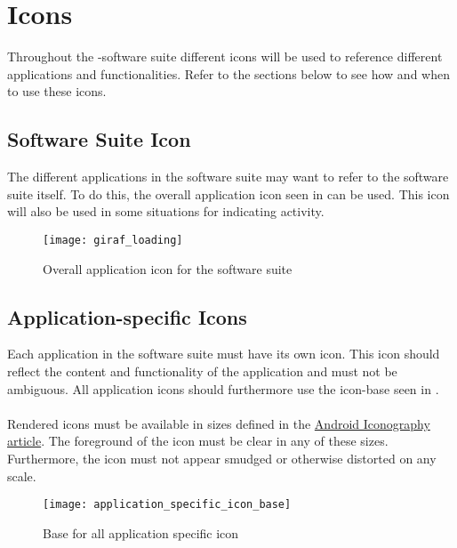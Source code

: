 
\chapter{Icons}

Throughout the \giraf-software suite different icons will be used to reference different applications and functionalities. Refer to the sections below to see how and when to use these icons.

\section{\giraf Software Suite Icon}
The different applications in the \giraf software suite may want to refer to the software suite itself. To do this, the overall application icon seen in  can be used. This icon will also be used in some situations for indicating activity. 

\begin{figure}[h]
	\centering
	\texttt{[image: giraf\_loading]}
	\caption{Overall application icon for the \giraf software suite}
	\label{fig:overall_application_icon}
\end{figure}

\section{Application-specific Icons}
Each application in the \giraf software suite must have its own icon. This icon should reflect the content and functionality of the application and must not be ambiguous. All application icons should furthermore use the icon-base seen in . 
\\\\
Rendered icons must be available in sizes defined in the \href{http://developer.android.com/design/style/iconography.html}{Android Iconography article}. The foreground of the icon must be clear in any of these sizes. Furthermore, the icon must not appear smudged or otherwise distorted on any scale.

\begin{figure}[h]
	\centering
	\texttt{[image: application\_specific\_icon\_base]}
	\caption{Base for all application specific icon}
	\label{fig:application_specific_icon_base}
\end{figure}

